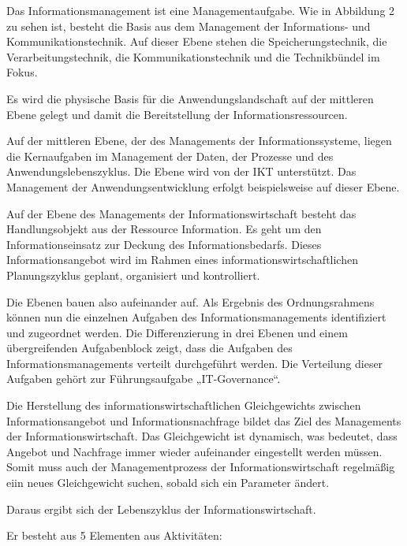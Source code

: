 \documentclass{article}
\begin{document}
\bigskip

Das Informationsmanagement ist eine Managementaufgabe. Wie in Abbildung 2 zu sehen ist, besteht die Basis aus dem
Management der Informations- und Kommunikationstechnik. Auf dieser Ebene stehen die Speicherungstechnik, die
Verarbeitungstechnik, die Kommunikationstechnik und die Technikbündel im Fokus.

Es wird die physische Basis für die Anwendungslandschaft auf der mittleren Ebene gelegt und damit die Bereitstellung der
Informationsressourcen.

Auf der mittleren Ebene, der des Managements der Informationssysteme, liegen die Kernaufgaben im Management der Daten,
der Prozesse und des Anwendungslebenszyklus. Die Ebene wird von der IKT unterstützt. Das Management der
Anwendungsentwicklung erfolgt beispielsweise auf dieser Ebene.

Auf der Ebene des Managements der Informationswirtschaft besteht das Handlungsobjekt aus der Ressource Information. Es
geht um den Informationseinsatz zur Deckung des Informationsbedarfs. Dieses Informationsangebot wird im Rahmen eines
informationswirtschaftlichen Planungszyklus geplant, organisiert und kontrolliert.

Die Ebenen bauen also aufeinander auf. Als Ergebnis des Ordnungsrahmens können nun die einzelnen Aufgaben des
Informationsmanagements identifiziert und zugeordnet werden. Die Differenzierung in drei Ebenen und einem
übergreifenden Aufgabenblock zeigt, dass die Aufgaben des Informationsmanagements verteilt durchgeführt werden. Die
Verteilung dieser Aufgaben gehört zur Führungsaufgabe „IT-Governance“.\newline


Die Herstellung des informationswirtschaftlichen Gleichgewichts zwischen Informationsangebot und Informationsnachfrage
bildet das Ziel des Managements der Informationswirtschaft. Das Gleichgewicht ist dynamisch, was bedeutet, dass Angebot
und Nachfrage immer wieder aufeinander eingestellt werden müssen. Somit muss auch der Managementprozess der
Informationswirtschaft regelmäßig eiin neues Gleichgewicht suchen, sobald sich ein Parameter ändert.

Daraus ergibt sich der Lebenszyklus der Informationswirtschaft.

Er besteht aus 5 Elementen aus Aktivitäten:
\end{document}
